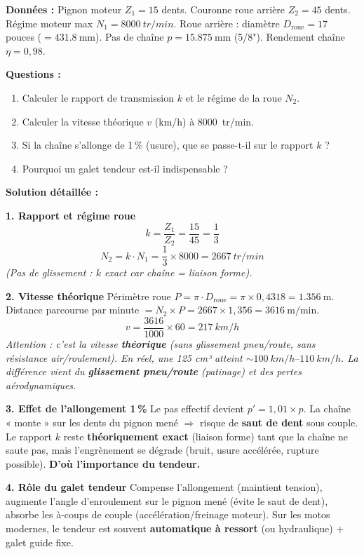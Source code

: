 \documentclass[11pt]{article}
\begin{document}
\begin{exoresolu}
\textbf{Données :} Pignon moteur $Z_1 = 15$ dents. Couronne roue arrière $Z_2 = 45$ dents. Régime moteur max $N_1 = \SI{8000}{tr/min}$. Roue arrière : diamètre $D_{\text{roue}} = 17$ pouces ($= \SI{431.8}{\milli\meter}$). Pas de chaîne $p = \SI{15.875}{\milli\meter}$ (5/8"). Rendement chaîne $\eta = 0,98$.

\textbf{Questions :}
\begin{enumerate}
    \item Calculer le rapport de transmission $k$ et le régime de la roue $N_2$.
    \item Calculer la vitesse théorique $v$ (km/h) à \SI{8000}{tr/min}.
    \item Si la chaîne s'allonge de 1\,\% (usure), que se passe-t-il sur le rapport $k$ ?
    \item Pourquoi un galet tendeur est-il indispensable ?
\end{enumerate}

\textbf{Solution détaillée :}

\textbf{1. Rapport et régime roue}
\[
k = \frac{Z_1}{Z_2} = \frac{15}{45} = \frac{1}{3}
\]
\[
N_2 = k \cdot N_1 = \frac{1}{3} \times 8000 = \SI{2667}{tr/min}
\]
\emph{(Pas de glissement : $k$ exact car chaîne = liaison forme).}

\textbf{2. Vitesse théorique}
Périmètre roue $P = \pi \cdot D_{\text{roue}} = \pi \times 0,4318 = \SI{1,356}{\meter}$.
Distance parcourue par minute $= N_2 \times P = 2667 \times 1,356 = \SI{3616}{\meter\per\minute}$.
\[
v = \frac{3616}{1000} \times 60 = \SI{217}{km/h}
\]
\emph{Attention : c'est la vitesse \textbf{théorique} (sans glissement pneu/route, sans résistance air/roulement). En réel, une 125 cm³ atteint $\sim \SIrange{100}{110}{km/h}$. La différence vient du \textbf{glissement pneu/route} (patinage) et des pertes aérodynamiques.}

\textbf{3. Effet de l'allongement 1\,\%}
Le pas effectif devient $p' = 1,01 \times p$. La chaîne « monte » sur les dents du pignon mené $\Rightarrow$ risque de \textbf{saut de dent} sous couple. Le rapport $k$ reste \textbf{théoriquement exact} (liaison forme) tant que la chaîne ne saute pas, mais l'engrènement se dégrade (bruit, usure accélérée, rupture possible). \textbf{D'où l'importance du tendeur.}

\textbf{4. Rôle du galet tendeur}
Compense l'allongement (maintient tension), augmente l'angle d'enroulement sur le pignon mené (évite le saut de dent), absorbe les à-coups de couple (accélération/freinage moteur). Sur les motos modernes, le tendeur est souvent \textbf{automatique à ressort} (ou hydraulique) + galet guide fixe.
\end{exoresolu}
\end{document}
